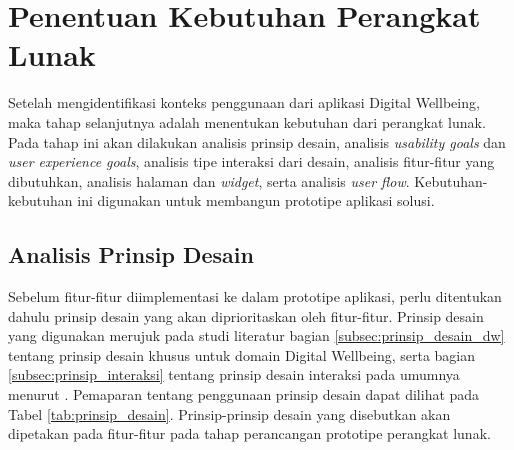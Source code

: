 \section{Penentuan Kebutuhan Perangkat Lunak}

Setelah mengidentifikasi konteks penggunaan dari aplikasi Digital Wellbeing, maka tahap selanjutnya adalah menentukan kebutuhan dari perangkat lunak. Pada tahap ini akan dilakukan analisis prinsip desain, analisis \textit{usability goals} dan \textit{user experience goals}, analisis tipe interaksi dari desain, analisis fitur-fitur yang dibutuhkan, analisis halaman dan \textit{widget}, serta analisis \textit{user flow}. Kebutuhan-kebutuhan ini digunakan untuk membangun prototipe aplikasi solusi.

\subsection{Analisis Prinsip Desain}
Sebelum fitur-fitur diimplementasi ke dalam prototipe aplikasi, perlu ditentukan dahulu prinsip desain yang akan diprioritaskan oleh fitur-fitur. Prinsip desain yang digunakan merujuk pada studi literatur bagian \ref{subsec:prinsip_desain_dw} tentang prinsip desain khusus untuk domain Digital Wellbeing, serta bagian \ref{subsec:prinsip_interaksi} tentang prinsip desain interaksi pada umumnya menurut \textcite{PreeceRogersSharp15}. Pemaparan tentang penggunaan prinsip desain dapat dilihat pada Tabel \ref{tab:prinsip_desain}. Prinsip-prinsip desain yang disebutkan akan dipetakan pada fitur-fitur pada tahap perancangan prototipe perangkat lunak.

